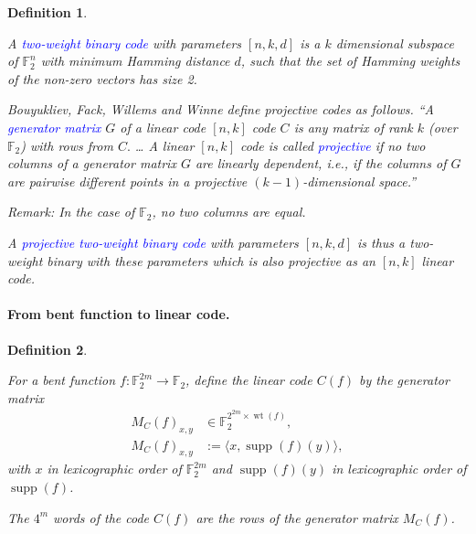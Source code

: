 \documentclass[12pt,a4paper]{article}
\newcommand{\mb}[1]{\mathbb{#1}}
\newcommand{\F}{\mb{F}}
\newcommand{\To}{\rightarrow}
\newcommand{\Emph}[1]{\emph{\textcolor{blue}{#1}}}
\newcommand{\support}[1]{\operatorname{supp}\left(#1\right)}
\newcommand{\weight}[1]{\operatorname{wt}\left(#1\right)}
\newtheorem{Definition}{Definition}
\begin{document}
\begin{Definition}
\label{def-two-weight-codes}
\cite{BouFFWW2006} \cite{Ton96uniformly}

A \Emph{two-weight binary code} with parameters $[n,k,d]$ is a $k$ dimensional subspace of $\F_2^n$
with
minimum Hamming distance $d$, such that the set of Hamming weights of the non-zero vectors has size
2.

Bouyukliev, Fack, Willems and Winne \cite[p. 60]{BouFFWW2006} define projective codes as follows.
``A \Emph{generator matrix} $G$ of a linear code $[n, k]$ code $C$ is any matrix
of rank $k$ (over $\F_2$) with rows from $C.$ \ldots
A linear $[n, k]$ code is called \Emph{projective} if no two columns of a generator matrix
$G$ are linearly dependent, i.e., if the columns of $G$ are pairwise different points in a
projective $(k-1)$-dimensional space.''

Remark: In the case of $\F_2$, no two columns are equal.

A \Emph{projective two-weight binary code} with parameters $[n, k, d]$ is thus a
two-weight binary with these parameters which is also projective as an $[n, k]$ linear code.
%
%
%
\end{Definition}

\paragraph*{From bent function to linear code.}
\begin{Definition}
\cite[Corollary 10]{DinD15class}

For a bent function $f : \F_2^{2m} \To \F_2$,
define the linear code $C(f)$ by the generator matrix
\begin{align*}
M_C(f)_{x,y} &\in \F_2^{2^{2m} \times \weight{f}},
\\
M_C(f)_{x,y} &:= \langle x, \support{f}(y) \rangle,
\end{align*}
with $x$ in lexicographic order of $\F_2^{2m}$
and $\support{f}(y)$ in lexicographic order of $\support{f}$.

The $4^m$ words of the code $C(f)$ are the rows of the generator matrix $M_C(f)$.
\end{Definition}
\end{document}
